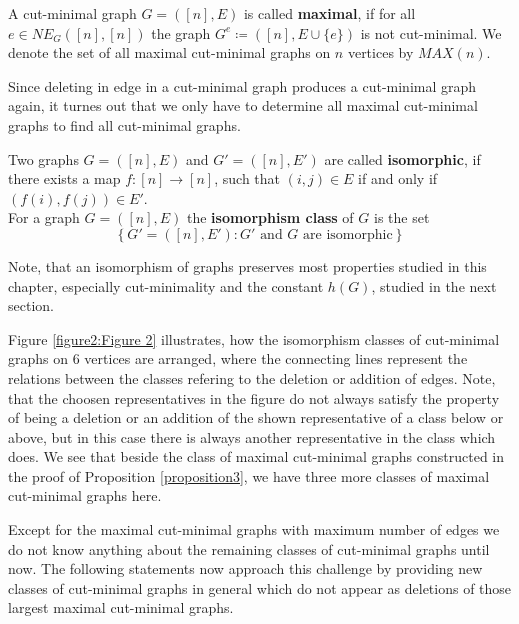 \begin{defi}
A cut-minimal graph \(G=([n],E)\) is called \textbf{maximal}, if for all\\
\(e\in NE_G([n],[n])\) the graph \(G^e\coloneqq ([n],E\cup\{e\})\) is not cut-minimal. We denote the set of all maximal cut-minimal graphs on \(n\) vertices by \(MAX(n)\).
\end{defi}
Since deleting in edge in a cut-minimal graph produces a cut-minimal graph again, it turnes out that we only have to determine all maximal cut-minimal graphs to find all cut-minimal graphs.
\begin{defi}
Two graphs \(G=([n],E)\) and \(G'=([n],E')\) are called \textbf{isomorphic}, if there exists a map \(f:[n]\rightarrow [n]\), such that \((i,j)\in E\) if and only if \((f(i),f(j))\in E'\).\\
For a graph \(G=([n],E)\) the \textbf{isomorphism class} of \(G\) is the set
\[
\left\{G'=([n],E'):G'\text{ and }G\text{ are isomorphic}\right\}
\]
\end{defi}

\begin{rem}
Note, that an isomorphism of graphs preserves most properties studied in this chapter, especially cut-minimality and the constant \(h(G)\), studied in the next section.
\end{rem}

Figure \ref{figure2:Figure 2} illustrates, how the isomorphism classes of cut-minimal graphs on \(6\) vertices are arranged, where the connecting lines represent the relations between the classes refering to the deletion or addition of edges. Note, that the choosen representatives in the figure do not always satisfy the property of being a deletion or an addition of the shown representative of a class below or above, but in this case there is always another representative in the class which does. We see that beside the class of maximal cut-minimal graphs constructed in the proof of Proposition \ref{proposition3}, we have three more classes of maximal cut-minimal graphs here.

\newpage



Except for the maximal cut-minimal graphs with maximum number of edges we do not know anything about the remaining classes of cut-minimal graphs until now. The following statements now approach this challenge by providing new classes of cut-minimal graphs in general which do not appear as deletions of those largest maximal cut-minimal graphs.

